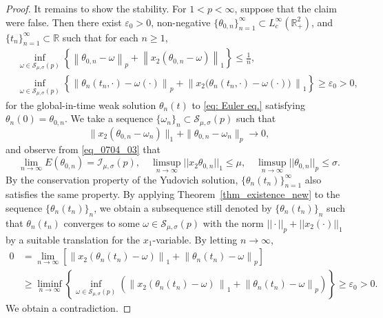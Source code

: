 \documentclass[11pt]{amsart}
\theoremstyle{definition}
\theoremstyle{definition}
\numberwithin{equation}{section}
\newcommand{\set}[1]{\{#1\}}
\newcommand{\0}{\emptyset}
\newcommand{\omg}{\omega}
\newcommand{\calI}{\mathcal I}
\newcommand{\calS}{\mathcal S}
\begin{document}
\begin{proof}
				It remains to show the stability. For $1<p<\infty$, suppose that the claim were false. Then there exist $\varepsilon_0>0$, non-negative $\{\theta_{0, n} \}_{n = 1}^{\infty}\subset L^{\infty}_{c}(\mathbb{R}^{2}_{+})$, and $\{t_n\}_{n = 1}^{\infty}\subset \mathbb{R}$ such that for each $n \ge 1$, 
				\begin{align*}\label{eq241228_2}
					&\inf_{\omega \in \calS_{\mu,\sigma}(p)} \left\{  \left\| \theta_{0, n} - \omega \right\|_{p} + \left\| x_2 (\theta_{0, n} - \omega) \right\|_{1} \right\}   \le  \frac{1}{n},\\
					&\inf_{\omega \in \calS_{\mu,\sigma}(p)}\left\{  \left\| \theta_{n} \left(t_n, \cdot \right) - \omg \left( \cdot  \right) \right\|_{p} + \left\| x_2 \big( \theta_{n} \left(t_n, \cdot \right) - \omega \left( \cdot  \right) \big) \, \right\|_{1}  \right\}  \ge  \varepsilon_0>0,
				\end{align*}
				for the global-in-time weak solution $ \theta_n(t)$ to \eqref{eq: Euler eq.} satisfying $\theta_n(0) = \theta_{0, n}$. We take a sequence $\{\omega_n\}_{n} \subset \calS_{\mu,\sigma}(p)$ such that
				\[
				\| x_2 (\theta_{0, n} - \omega_n) \|_{1} + \| \theta_{0, n} - \omega_n\|_{p}  \to  0,
				\]
				and observe from \eqref{eq_0704_03} that  
				\[
				\lim_{n \to \infty}E(\theta_{0, n}) = \calI_{\mu,\sigma}(p),\quad \limsup_{n\to\infty}||x_2\theta_{0, n}||_{1}\leq \mu, \quad \limsup_{n\to\infty}||\theta_{0, n} ||_{p}\leq \sigma.
				\]
				By the conservation property of the Yudovich solution, $\set{\theta_{n}(t_n)}_{n=1}^\infty$ also satisfies the same property. By applying Theorem~\ref{thm_existence_new} to the sequence $\{ \theta_n(t_n)  \}_{n}$, we obtain a subsequence still denoted by $\{ \theta_n(t_n)  \}_{n}$ such that $\theta_n(t_n)$ converges to some ${\omega} \in \calS_{\mu,\sigma}(p)$ with the norm $||\cdot ||_{p}+||x_2(\cdot)||_{1}$ by a suitable translation for the $x_1$-variable. By letting $n \to \infty$,
				\begin{align*}
					0 &=  \lim_{n \to \infty} \left[	\left\| x_2 \left( \theta_n (t_n) - {\omega} \right) \right\|_{1} +    \left\|  \theta_n (t_n) - {\omega} \right\|_{p} \right] \\
					&\ge  \liminf_{n \to \infty} \left\{ \inf_{\omega \in \calS_{\mu,\sigma}(p)} \left(   \left\| x_2 \left( \theta_{n} \left(t_n\right) - \omega \right)\, \right\|_{1} + \left\| \theta_{n} \left(t_n \right) - \omega \right\|_{p} \right) \right\}  \ge  \varepsilon_0>0.
				\end{align*}
				We obtain a contradiction.
				

\end{proof}
\end{document}
